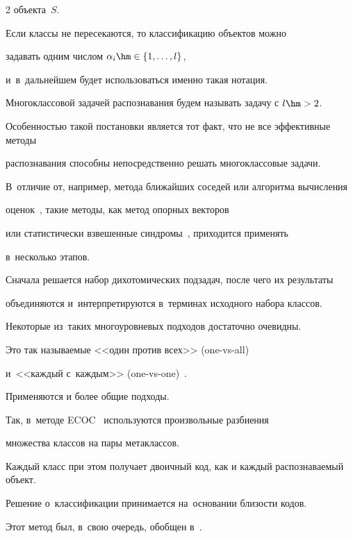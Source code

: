 \begin{multicols}{2}
объекта~$S$.





\smallskip





Если классы не пересекаются, то классификацию объектов можно 


задавать одним числом $\alpha_i\hm\in\{1,\ldots,l\}$, 


и~в~дальнейшем будет использоваться именно такая нотация.





Многоклассовой задачей распознавания будем называть задачу с $l\hm>2$.


Особенностью такой постановки является тот факт, что не все эффективные методы 


распознавания способны непосредственно решать многоклассовые задачи.


В~отличие от, например, метода ближайших соседей или алгоритма вычисления 


оценок~\cite{zhur1, zhur2}, такие методы, как метод опорных векторов~\cite{svm} 


или статистически взвешенные синдромы~\cite{sws}, приходится применять 


в~несколько этапов.


Сначала решается набор дихотомических подзадач, после чего их результаты 


объединяются и~интерпретируются в~терминах исходного набора классов.





Некоторые из~таких многоуровневых подходов достаточно очевидны.


Это так называемые <<один против всех>> (one-vs-all)~\cite{svm} 


и~<<каждый с~каждым>> (one-vs-one)~\cite{knerr}.


Применяются и более общие подходы.


Так, в~методе ECOC~\cite{Dietterich} используются произвольные разбиения 


множества классов на пары метаклассов.


Каждый класс при этом получает двоичный код, как и каждый распознаваемый объект.


Решение о~классификации принимается на~основании близости кодов.


Этот метод был, в~свою очередь, обобщен в~\cite{Allwein}.



\end{multicols}
